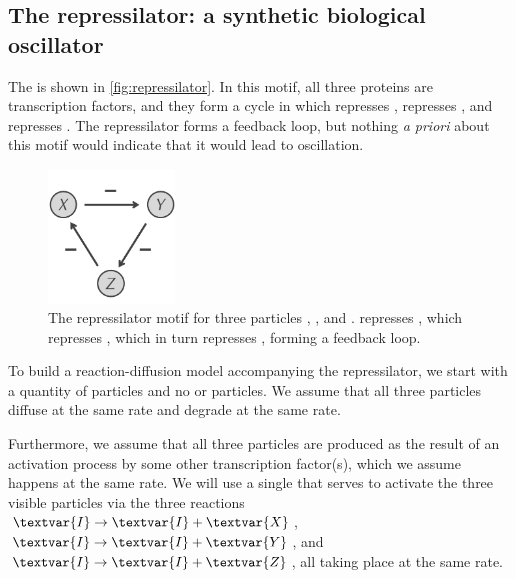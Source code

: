 \FloatBarrier
{}
\subsection{The repressilator: a synthetic biological oscillator}

The  is shown in \autoref{fig:repressilator}. In this motif, all three proteins are transcription factors, and they form a cycle in which  represses ,  represses , and  represses . The repressilator forms a feedback loop, but nothing \textit{a priori} about this motif would indicate that it would lead to oscillation.\\

\begin{figure}[h]
\centering
\mySfFamily
\includegraphics[width = 0.3\textwidth]{../images/repressilator.png}
\caption{The repressilator motif for three particles , , and .  represses , which represses , which in turn represses , forming a feedback loop.}
\label{fig:repressilator}
\end{figure}

\begin{qbox}\end{qbox}

To build a reaction-diffusion model accompanying the repressilator, we start with a quantity of  particles and no  or  particles. We assume that all three particles diffuse at the same rate and degrade at the same rate.

Furthermore, we assume that all three particles are produced as the result of an activation process by some other transcription factor(s), which we assume happens at the same rate. We will use a single   that serves to activate the three visible particles via the three reactions $\textvar{I} \rightarrow \textvar{I} + \textvar{X}$, $\textvar{I} \rightarrow \textvar{I} + \textvar{Y}$, and $\textvar{I} \rightarrow \textvar{I} + \textvar{Z}$, all taking place at the same rate.


